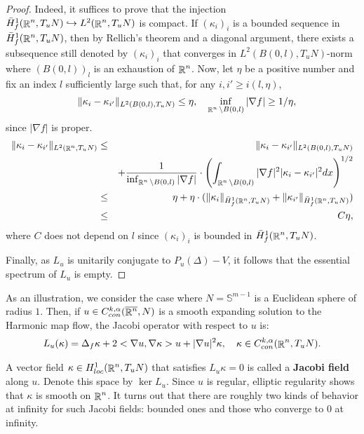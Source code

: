 \documentclass[a4paper,11pt,reqno]{amsart}
\def\R{\mathop{\rm \mathbb{R}}\nolimits}
\newcommand{\Sp}{\mathbb{S}}
\begin{document}
\begin{proof}
Indeed, it suffices to prove that the injection $\bar{H}_f^1(\R^n,T_uN)\hookrightarrow L^2(\R^n,T_uN)$ is compact. If $(\kappa_i)_i$ is a bounded sequence in $\bar{H}_f^1(\R^n,T_uN)$, then by Rellich's theorem and a diagonal argument, there exists a subsequence still denoted by $(\kappa_i)_i$ that converges in $L^2(B(0,l),T_uN)$-norm where $(B(0,l))_l$ is an exhaustion of $\R^n$. Now, let $\eta$ be a positive number and fix an index $l$ sufficiently large such that, for any $i,i'\geq i(l,\eta)$,
\begin{eqnarray*}
&&\|\kappa_i-\kappa_{i'}\|_{L^2(B(0,l),T_uN)}\leq \eta,\quad\inf_{\R^n\setminus B(0,l)}\arrowvert\nabla f\arrowvert\geq 1/\eta,
\end{eqnarray*}
since $|\nabla f|$ is proper.
\begin{eqnarray*}
\|\kappa_i-\kappa_{i'}\|_{L^2(\R^n,T_uN)}&\leq& \|\kappa_i-\kappa_{i'}\|_{L^2(B(0,l),T_uN)}\\
&&+\frac{1}{\inf_{\R^n\setminus B(0,l)}\arrowvert\nabla f\arrowvert}\cdot\left(\int_{\R^n\setminus B(0,l)}\arrowvert\nabla f\arrowvert^2\arrowvert \kappa_i-\kappa_{i'}\arrowvert^2dx\right)^{1/2}\\
&\leq&\eta+\eta\cdot(\|\kappa_i\|_{\bar{H}_f^1(\R^n,T_uN)}+\|\kappa_{i'}\|_{\bar{H}_f^1(\R^n,T_uN)})\\
&\leq& C\eta,
\end{eqnarray*}
where $C$ does not depend on $l$ since $(\kappa_i)_i$ is bounded in $\bar{H}_f^1(\R^n,T_uN)$.

Finally, as $L_u$ is unitarily conjugate to $P_u(\Delta)-V$, it follows that the essential spectrum of $L_u$ is empty.

\end{proof}

As an illustration, we consider the case where $N=\Sp^{m-1}$ is a Euclidean sphere of radius $1$. Then, if $u\in C_{con}^{k,\alpha}(\overline{\R^n},N)$ is a smooth expanding solution to the Harmonic map flow, the Jacobi operator with respect to $u$ is:
\begin{eqnarray*}
L_u(\kappa)=\Delta_f\kappa+2<\nabla u,\nabla \kappa>u+|\nabla u|^2\kappa,\quad \kappa\in C_{con}^{k,\alpha}(\R^n,T_uN).
\end{eqnarray*}


A vector field $\kappa\in H^1_{loc}(\R^n,T_uN)$ that satisfies $L_u\kappa=0$ is called a \textbf{Jacobi field} along $u$. Denote this space by $\ker L_u$. Since $u$ is regular, elliptic regularity shows that $\kappa$ is smooth on $\R^n$. It turns out that there are roughly two kinds of behavior at infinity for such Jacobi fields: bounded ones and those who converge to $0$ at infinity.
\end{document}
